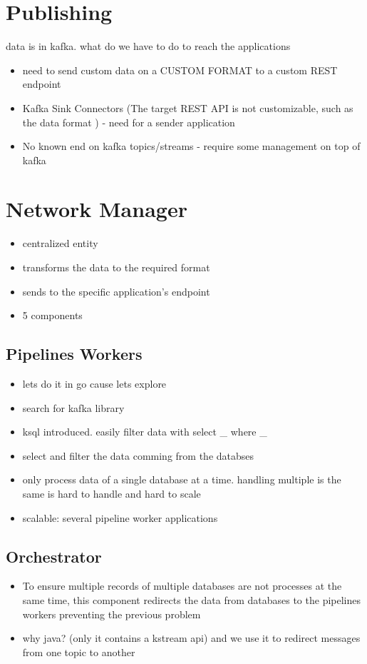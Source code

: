 \section{Publishing}

data is in kafka. what do we have to do to reach the applications

\begin{itemize}
    \item need to send custom data on a CUSTOM FORMAT to a custom REST endpoint
    \item Kafka Sink Connectors (The target REST API is not customizable, such as the data format ) - need for a sender application
    \item No known end on kafka topics/streams - require some management on top of kafka
\end{itemize}

\section{Network Manager}  %
\begin{itemize}
    \item centralized entity
    \item transforms the data to the required format
    \item sends to the specific application's endpoint
    \item 5 components
\end{itemize}

\subsection{Pipelines Workers}
\begin{itemize}
    \item lets do it in go cause lets explore
    \item search for kafka library
    \item ksql introduced. easily filter data with select \_ where \_
    \item select and filter the data comming from the databses
    \item only process data of a single database at a time. handling multiple is the same is hard to handle and hard to scale
    \item scalable: several pipeline worker applications
\end{itemize}

\subsection{Orchestrator}
\begin{itemize}
    \item To ensure multiple records of multiple databases are not processes at the same time, this component redirects the data from databases to the pipelines workers preventing the previous problem
    \item why java? (only it contains a kstream api) and we use it to redirect messages from one topic to another
\end{itemize}

